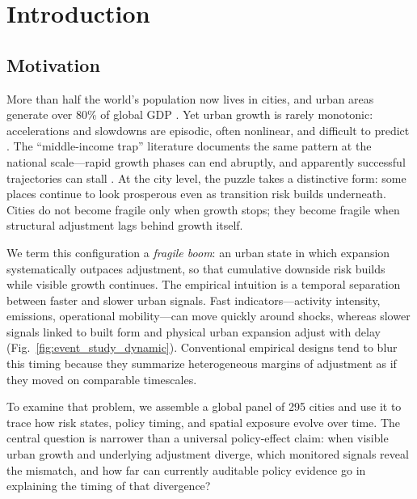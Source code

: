 \documentclass[11pt,a4paper]{article}
\begin{document}
\section{Introduction}

\subsection{Motivation}
More than half the world's population now lives in cities, and urban areas generate over 80\% of global GDP \citep{glaeser2011triumph,duranton2015growing}.
Yet urban growth is rarely monotonic: accelerations and slowdowns are episodic, often nonlinear, and difficult to predict \citep{hausmann2005growth,eichengreen2012slowdown}.
The ``middle-income trap'' literature documents the same pattern at the national scale---rapid growth phases can end abruptly, and apparently successful trajectories can stall \citep{hidalgo2007product}.
At the city level, the puzzle takes a distinctive form: some places continue to look prosperous even as transition risk builds underneath.
Cities do not become fragile only when growth stops; they become fragile when structural adjustment lags behind growth itself.

We term this configuration a \emph{fragile boom}: an urban state in which expansion systematically outpaces adjustment, so that cumulative downside risk builds while visible growth continues.
The empirical intuition is a temporal separation between faster and slower urban signals.
Fast indicators---activity intensity, emissions, operational mobility---can move quickly around shocks, whereas slower signals linked to built form and physical urban expansion adjust with delay (Fig.~\ref{fig:event_study_dynamic}).
Conventional empirical designs tend to blur this timing because they summarize heterogeneous margins of adjustment as if they moved on comparable timescales.

To examine that problem, we assemble a global panel of 295 cities and use it to trace how risk states, policy timing, and spatial exposure evolve over time.
The central question is narrower than a universal policy-effect claim: when visible urban growth and underlying adjustment diverge, which monitored signals reveal the mismatch, and how far can currently auditable policy evidence go in explaining the timing of that divergence?
\end{document}
